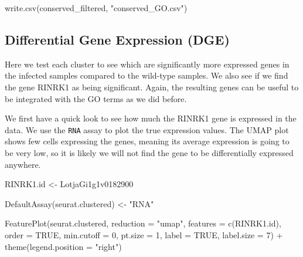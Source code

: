 \documentclass[
  letterpaper,
  DIV=11,
  numbers=noendperiod]{scrartcl}
\newenvironment{Shaded}{}{}
\newcommand{\AttributeTok}[1]{\textcolor[rgb]{0.49,0.56,0.16}{#1}}
\newcommand{\ConstantTok}[1]{\textcolor[rgb]{0.53,0.00,0.00}{#1}}
\newcommand{\DecValTok}[1]{\textcolor[rgb]{0.25,0.63,0.44}{#1}}
\newcommand{\FunctionTok}[1]{\textcolor[rgb]{0.02,0.16,0.49}{#1}}
\newcommand{\NormalTok}[1]{#1}
\newcommand{\OtherTok}[1]{\textcolor[rgb]{0.00,0.44,0.13}{#1}}
\newcommand{\SpecialCharTok}[1]{\textcolor[rgb]{0.25,0.44,0.63}{#1}}
\newcommand{\StringTok}[1]{\textcolor[rgb]{0.25,0.44,0.63}{#1}}
\begin{document}
\begin{Shaded}
\begin{Highlighting}[]
\FunctionTok{write.csv}\NormalTok{(conserved\_filtered, }\StringTok{"conserved\_GO.csv"}\NormalTok{)}
\end{Highlighting}
\end{Shaded}

\subsection{Differential Gene Expression
(DGE)}\label{differential-gene-expression-dge}

Here we test each cluster to see which are significantly more expressed
genes in the infected samples compared to the wild-type samples. We also
see if we find the gene RINRK1 as being significant. Again, the
resulting genes can be useful to be integrated with the GO terms as we
did before.

We first have a quick look to see how much the RINRK1 gene is expressed
in the data. We use the \texttt{RNA} assay to plot the true expression
values. The UMAP plot shows few cells expressing the genes, meaning its
average expression is going to be very low, so it is likely we will not
find the gene to be differentially expressed anywhere.

\begin{Shaded}
\begin{Highlighting}[]
\NormalTok{RINRK1.id }\OtherTok{\textless{}{-}} \StringTok{\textquotesingle{}LotjaGi1g1v0182900\textquotesingle{}}

\FunctionTok{DefaultAssay}\NormalTok{(seurat.clustered) }\OtherTok{\textless{}{-}} \StringTok{"RNA"}

\FunctionTok{FeaturePlot}\NormalTok{(seurat.clustered,}
            \AttributeTok{reduction =} \StringTok{"umap"}\NormalTok{, }
            \AttributeTok{features =} \FunctionTok{c}\NormalTok{(RINRK1.id), }
            \AttributeTok{order =} \ConstantTok{TRUE}\NormalTok{,}
            \AttributeTok{min.cutoff =} \DecValTok{0}\NormalTok{, }
            \AttributeTok{pt.size =} \DecValTok{1}\NormalTok{,}
            \AttributeTok{label =} \ConstantTok{TRUE}\NormalTok{,}
            \AttributeTok{label.size =} \DecValTok{7}\NormalTok{) }\SpecialCharTok{+} \FunctionTok{theme}\NormalTok{(}\AttributeTok{legend.position =} \StringTok{"right"}\NormalTok{)}
\end{Highlighting}
\end{Shaded}
\end{document}
